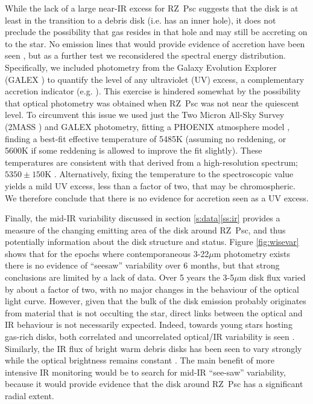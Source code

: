 \documentclass[]{rsos}
\begin{document}
While the lack of a large near-IR excess for RZ~Psc suggests that the disk is at least in
the transition to a debris disk (i.e. has an inner hole), it does not preclude the
possibility that gas resides in that hole and may still be accreting on to the star. No
emission lines that would provide evidence of accretion have been seen
\cite{2013Ap.....56..453P,2014A&A...563A.139P}, but as a further test we reconsidered the
spectral energy distribution. Specifically, we included photometry from the Galaxy
Evolution Explorer (GALEX \cite{2003SPIE.4854..336M}) to quantify the level of any
ultraviolet (UV) excess, a complementary accretion indicator
(e.g. \cite{1998ApJ...509..802C}). This exercise is hindered somewhat by the possibility
that optical photometry was obtained when RZ~Psc was not near the quiescent level. To
circumvent this issue we used just the Two Micron All-Sky Survey (2MASS
\cite{2003tmc..book.....C}) and GALEX photometry, fitting a PHOENIX atmosphere model
\cite{2005ESASP.576..565B}, finding a best-fit effective temperature of 5485K (assuming
no reddening, or 5600K if some reddening is allowed to improve the fit slightly). These
temperatures are consistent with that derived from a high-resolution spectrum;
$5350 \pm 150$K \cite{2014A&A...563A.139P}. Alternatively, fixing the temperature to the
spectroscopic value yields a mild UV excess, less than a factor of two, that may be
chromospheric. We therefore conclude that there is no evidence for accretion seen as a UV
excess.

Finally, the mid-IR variability discussed in section \ref{s:data}\ref{ss:ir} provides a
measure of the changing emitting area of the disk around RZ~Psc, and thus potentially
information about the disk structure and status. Figure \ref{fig:wisevar} shows that for
the epochs where contemporaneous 3-22$\mu$m photometry exists there is no evidence of
``seesaw'' variability over 6 months, but that strong conclusions are limited by a lack
of data. Over 5 years the 3-5$\mu$m disk flux varied by about a factor of two, with no
major changes in the behaviour of the optical light curve. However, given that the bulk
of the disk emission probably originates from material that is not occulting the star,
direct links between the optical and IR behaviour is not necessarily expected. Indeed,
towards young stars hosting gas-rich disks, both correlated and uncorrelated optical/IR
variability is seen \cite{2014AJ....147...82C}. Similarly, the IR flux of bright warm
debris disks has been seen to vary strongly while the optical brightness remains constant
\cite{2015ApJ...805...77M}. The main benefit of more intensive IR monitoring would be to
search for mid-IR ``see-saw'' variability, because it would provide evidence that the
disk around RZ~Psc has a significant radial extent.
\end{document}
